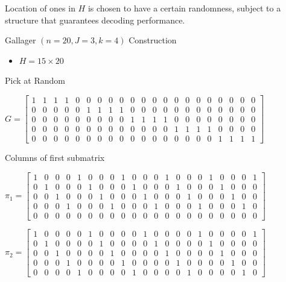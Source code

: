\documentclass[11pt]{article}
\providecommand{\tightlist}{%
      \setlength{\itemsep}{0pt}\setlength{\parskip}{0pt}}
\begin{document}
Location of ones in \(H\) is chosen to have a certain randomness,
subject to a structure that guarantees decoding performance.

    Gallager \((n = 20, J = 3, k = 4 )\) Construction

\begin{itemize}
\tightlist
\item
  \(H = 15 \times 20\)
\end{itemize}

Pick at Random

\(G = \begin{bmatrix}
1 & 1 & 1 & 1 & 0 & 0 & 0 & 0 & 0 & 0 & 0 & 0 & 0 & 0 & 0 & 0 & 0 & 0 & 0 & 0 & 0 \\
0 & 0 & 0 & 0 & 0 & 1 & 1 & 1 & 1 & 0 & 0 & 0 & 0 & 0 & 0 & 0 & 0 & 0 & 0 & 0 & 0 \\
0 & 0 & 0 & 0 & 0 & 0 & 0 & 0 & 0 & 1 & 1 & 1 & 1 & 0 & 0 & 0 & 0 & 0 & 0 & 0 & 0 \\
0 & 0 & 0 & 0 & 0 & 0 & 0 & 0 & 0 & 0 & 0 & 0 & 0 & 1 & 1 & 1 & 1 & 0 & 0 & 0 & 0 \\
0 & 0 & 0 & 0 & 0 & 0 & 0 & 0 & 0 & 0 & 0 & 0 & 0 & 0 & 0 & 0 & 0 & 1 & 1 & 1 & 1
\end{bmatrix}\)

Columns of first submatrix

\(\pi_1 = \begin{bmatrix}
1 & 0 & 0 & 0 & 1 & 0 & 0 & 0 & 1 & 0 & 0 & 0 & 1 & 0 & 0 & 0 & 1 & 0 & 0 & 0 & 1 \\
0 & 1 & 0 & 0 & 0 & 1 & 0 & 0 & 0 & 1 & 0 & 0 & 0 & 1 & 0 & 0 & 0 & 1 & 0 & 0 & 0 \\
0 & 0 & 1 & 0 & 0 & 0 & 1 & 0 & 0 & 0 & 1 & 0 & 0 & 0 & 1 & 0 & 0 & 0 & 1 & 0 & 0 \\
0 & 0 & 0 & 1 & 0 & 0 & 0 & 1 & 0 & 0 & 0 & 1 & 0 & 0 & 0 & 1 & 0 & 0 & 0 & 1 & 0 \\
0 & 0 & 0 & 0 & 0 & 0 & 0 & 0 & 0 & 0 & 0 & 0 & 0 & 0 & 0 & 0 & 0 & 0 & 0 & 0 & 0
\end{bmatrix}\)

\(\pi_2 = \begin{bmatrix}
1 & 0 & 0 & 0 & 0 & 1 & 0 & 0 & 0 & 0 & 1 & 0 & 0 & 0 & 0 & 1 & 0 & 0 & 0 & 0 & 1 \\
0 & 1 & 0 & 0 & 0 & 0 & 1 & 0 & 0 & 0 & 0 & 1 & 0 & 0 & 0 & 0 & 1 & 0 & 0 & 0 & 0 \\
0 & 0 & 1 & 0 & 0 & 0 & 0 & 1 & 0 & 0 & 0 & 0 & 1 & 0 & 0 & 0 & 0 & 1 & 0 & 0 & 0 \\
0 & 0 & 0 & 1 & 0 & 0 & 0 & 0 & 1 & 0 & 0 & 0 & 0 & 1 & 0 & 0 & 0 & 0 & 1 & 0 & 0 \\
0 & 0 & 0 & 0 & 1 & 0 & 0 & 0 & 0 & 1 & 0 & 0 & 0 & 0 & 1 & 0 & 0 & 0 & 0 & 1 & 0
\end{bmatrix}\)
\end{document}
